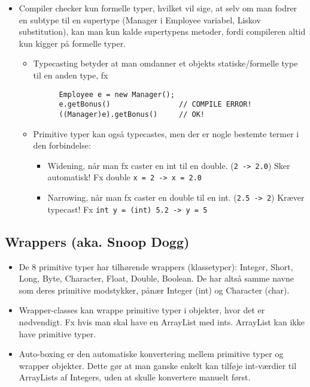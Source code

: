 \begin{itemize}
  \item Compiler checker kun formelle typer, hvilket vil sige, at selv om man fodrer en subtype til en supertype (Manager i Employee variabel, Liskov substitution), kan man kun kalde supertypens metoder, fordi compileren altid kun kigger på formelle typer.
  \begin{itemize}
    \item Typecasting betyder at man omdanner et objekts statiske/formelle type til en anden type, fx
    \begin{verbatim}
      Employee e = new Manager();
	  e.getBonus()	              // COMPILE ERROR!
	  ((Manager)e).getBonus()     // OK!
    \end{verbatim}
    \item Primitive typer kan også typecastes, men der er nogle bestemte termer i den forbindelse:
    \begin{itemize}
      \item Widening, når man fx caster en int til en double. (\verb|2 -> 2.0|)
    Sker automatisk! Fx double \verb|x = 2 -> x = 2.0|
      \item Narrowing, når man fx caster en double til en int. (\verb|2.5 -> 2|)
    Kræver typecast! Fx \verb|int y = (int) 5.2 -> y = 5|
    \end{itemize}
  \end{itemize}
\end{itemize}

\subsection{Wrappers (aka. Snoop Dogg)}

\begin{itemize}
  \item De 8 primitive typer har tilhørende wrappers (klassetyper): Integer, Short, Long, Byte, Character, Float, Double, Boolean. De har altså samme navne som deres primitive modstykker, pånær Integer (int) og Character (char).
  \item Wrapper-classes kan wrappe primitive typer i objekter, hvor det er nødvendigt. Fx hvis man skal have en ArrayList med ints. ArrayList kan ikke have primitive typer.
  \item Auto-boxing er den automatiske konvertering mellem primitive typer og wrapper objekter. Dette gør at man ganske enkelt kan tilføje int-værdier til ArrayLists af Integers, uden at skulle konvertere manuelt først.
\end{itemize}


